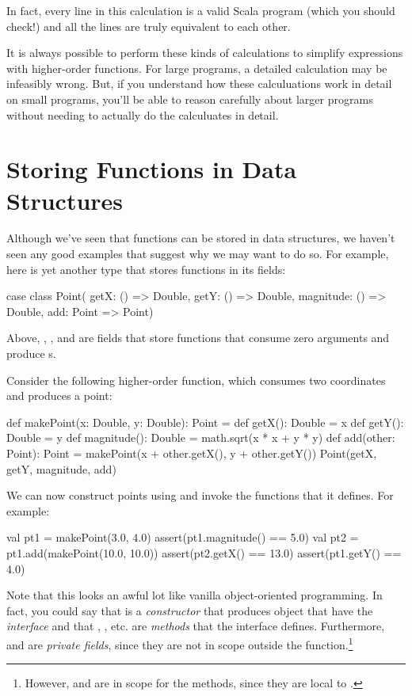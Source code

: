 \documentclass{book}
\begin{document}
In fact, every line in this calculation is a valid Scala program (which you
should check!) and all the lines are truly equivalent to each other.

It is always possible to perform these kinds of calculations to simplify
expressions with higher-order functions. For large programs, a detailed
calculation may be infeasibly wrong. But, if you understand how these
calculuations work in detail on small programs, you'll be able to reason
carefully about larger programs without needing to actually do the calculuates
in detail.

\section{Storing Functions in Data Structures}

Although we've seen that functions can be stored in data structures,
we haven't seen any good examples that suggest why we may want to do so.
For example, here is yet another type that stores functions in its
fields:
\begin{scalacode}
case class Point(
  getX: () => Double,
  getY: () => Double,
  magnitude: () => Double,
  add: Point => Point)
\end{scalacode}

Above, , , and 
are fields that store functions that consume zero arguments and produce
s.

Consider the following higher-order function, which consumes two coordinates
and produces a point:
\begin{scalacode}
def makePoint(x: Double, y: Double): Point = {
  def getX(): Double = x
  def getY(): Double = y
  def magnitude(): Double = math.sqrt(x * x + y * y)
  def add(other: Point): Point = makePoint(x + other.getX(), y + other.getY())
  Point(getX, getY, magnitude, add)
}
\end{scalacode}

We can now construct points using 
and invoke the functions that it defines. For example:
%
\begin{scalacode}
val pt1 = makePoint(3.0, 4.0)
assert(pt1.magnitude() == 5.0)
val pt2 = pt1.add(makePoint(10.0, 10.0))
assert(pt2.getX() == 13.0)
assert(pt1.getY() == 4.0)
\end{scalacode}

Note that this looks an awful lot like vanilla object-oriented programming.
In fact, you could say that  is a \emph{constructor}
that produces object that have the \emph{interface} 
and that , , etc. are \emph{methods} that the
interface defines.
Furthermore,  and  are \emph{private fields},
since they are not in scope outside the 
function.\footnote{However,  and  are in scope
for the methods, since they are local to .}
\end{document}
